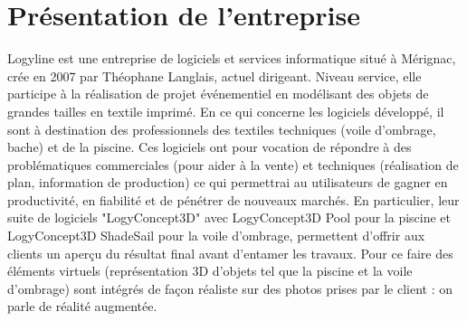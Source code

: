 
\section{Présentation de l'entreprise}

Logyline est une entreprise de logiciels et services informatique situé à Mérignac, crée en 2007 par Théophane Langlais, actuel dirigeant. Niveau service, elle participe à la réalisation de projet événementiel en modélisant des objets de grandes tailles en textile imprimé. En ce qui concerne les logiciels développé, il sont à destination des professionnels des textiles techniques (voile d’ombrage, bache) et de la piscine. Ces logiciels ont pour vocation de répondre à des problématiques commerciales (pour aider à la vente) et techniques (réalisation de plan, information de production) ce qui permettrai au utilisateurs de gagner en productivité, en fiabilité et de pénétrer de nouveaux marchés. En particulier, leur suite de logiciels "LogyConcept3D" avec LogyConcept3D Pool pour la piscine et LogyConcept3D ShadeSail pour la voile d'ombrage, permettent d'offrir aux clients un aperçu du résultat final avant d'entamer les travaux. Pour ce faire des éléments virtuels (représentation 3D d’objets tel que la piscine et la voile d’ombrage) sont intégrés de façon réaliste sur des photos prises par le client : on parle de réalité augmentée.